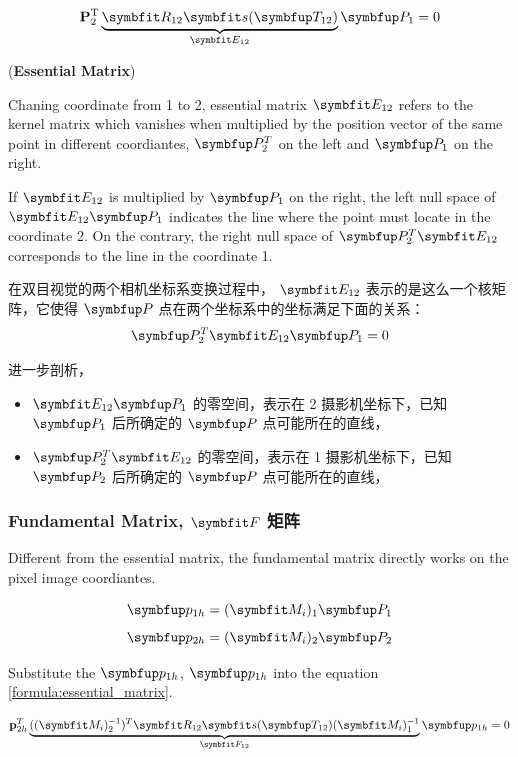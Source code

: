 \begin{equation}\label{formula:essential_matrix}
\mathbf{P}_{2}^{\mathrm{T}} \underbrace{\Matr{R}_{12} \Matr{s}(\Vect{T}_{12})}_{\Matr{E}_{12}} \Vect{P}_{1}=0
\end{equation}
\begin{definition}
(\textbf{Essential Matrix})

Chaning coordinate from 1 to 2, essential matrix $\Matr{E}_{12}$ refers to the kernel matrix which vanishes when multiplied by the position vector of the same point in different coordiantes, $\Vect{P}_2^T$ on the left and $\Vect{P}_1$ on the right.

If $\Matr{E}_{12}$ is multiplied by $\Vect{P}_1$ on the right, the left null space of $\Matr{E}_{12}\Vect{P}_1$ indicates the line where the point must locate in the coordinate 2. On the contrary, the right null space of $\Vect{P}_2^T \Matr{E}_{12}$ corresponds to the line in the coordinate 1.

在双目视觉的两个相机坐标系变换过程中， $\Matr{E}_{12}$ 表示的是这么一个核矩阵，它使得 $\Vect{P}$ 点在两个坐标系中的坐标满足下面的关系：
\begin{equation}
	\Vect{P}_2^T\Matr{E}_{12}\Vect{P}_1=0
\end{equation}

进一步剖析，
\begin{itemize}
	\item $\Matr{E}_{12}\Vect{P}_1$ 的零空间，表示在 2 摄影机坐标下，已知$\Vect{P}_1$ 后所确定的 $\Vect{P}$ 点可能所在的直线，
	\item $\Vect{P}_2^T \Matr{E}_{12}$ 的零空间，表示在 1 摄影机坐标下，已知$\Vect{P}_2$ 后所确定的 $\Vect{P}$ 点可能所在的直线，
\end{itemize}


\end{definition}
\subsubsection{Fundamental Matrix, $\Matr{F}$ 矩阵}

Different from the essential matrix, the fundamental matrix directly works on the pixel image coordiantes.

$$\Vect{p}_{1h} = (\Matr{M}_i)_1 \Vect{P}_1$$
$$\Vect{p}_{2h} = (\Matr{M}_i)_2 \Vect{P}_2$$

Substitute the $\Vect{p}_{1h}$, $\Vect{p}_{1h}$ into the equation \ref{formula:essential_matrix}.

\begin{equation}\label{formula:fundamental_matrix}
\mathbf{p}_{2h}^{T} \underbrace{ ((\Matr{M}_{i})_2^{-1})^T \Matr{R}_{12} \Matr{s}(\Vect{T}_{12}) (\Matr{M}_{i})_1^{-1}}_{\Matr{F}_{12}} \Vect{p}_{1h}=0
\end{equation}

